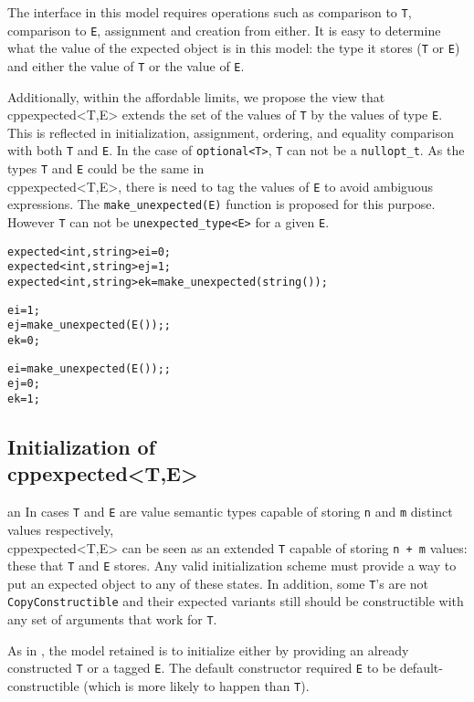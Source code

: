 \documentclass[a4paper,10pt]{article}
\newcommand{\cpp}[1]{\lstinline{#1}}
\begin{document}
The interface in this model requires operations such as comparison to \cpp{T}, comparison to \cpp{E}, assignment and creation from either. It is easy to determine what the value of the expected object is in this model: the type it stores (\cpp{T} or \cpp{E}) and either the value of \cpp{T} or the value of \cpp{E}. 

Additionally, within the affordable limits, we propose the view that \\cpp{expected<T,E>} extends the set of the values of \cpp{T} by the values of type \cpp{E}. This is reflected in initialization, assignment, ordering, and equality comparison with both \cpp{T} and \cpp{E}. In the case of  \cpp{optional<T>}, \cpp{T} can not be a \cpp{nullopt_t}. As the types \cpp{T} and \cpp{E} could be the same in \\cpp{expected<T,E>}, there is need to tag the values of \cpp{E} to avoid ambiguous expressions. The \cpp{make_unexpected(E)} function is proposed for this purpose. However \cpp{T} can not be  \cpp{unexpected_type<E>} for a given \cpp{E}.

\begin{alltt}
expected<int, string> ei = 0;
expected<int, string> ej = 1;
expected<int, string> ek = make_unexpected(string());

ei = 1;
ej = make_unexpected(E());;
ek = 0;

ei = make_unexpected(E());;
ej = 0;
ek = 1;
\end{alltt}

\subsection{Initialization of \\cpp{expected<T,E>}}
an
In cases \cpp{T} and \cpp{E} are value semantic types capable of storing \cpp{n} and \cpp{m} distinct values respectively, \\cpp{expected<T,E>} can be seen as an extended \cpp{T} capable of storing \cpp{n + m} values: these that \cpp{T} and \cpp{E} stores. Any valid initialization scheme must provide a way to put an expected object to any of these states. In addition, some \cpp{T}'s  are not \cpp{CopyConstructible} and their expected variants still should be constructible with any set of arguments that work for \cpp{T}.

\noindent
As in \cite{OptionalRev4}, the model retained is to initialize either by providing an already constructed \cpp{T} or a tagged \cpp{E}. The default constructor required \cpp{E} to be default-constructible (which is more likely to happen than \cpp{T}).
\end{document}
